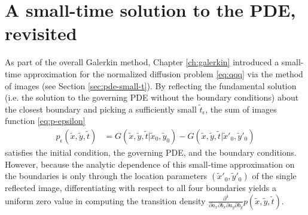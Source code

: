 \section{A small-time solution to the PDE, revisited}
As part of the overall Galerkin method, Chapter \ref{ch:galerkin}
introduced a small-time approximation for the normalized diffusion
problem \eqref{eq:qqq} via the method of images (see Section
\ref{sec:pde-small-t}). By reflecting the fundamental solution
(i.e. the solution to the governing PDE without the boundary conditions) about the
closest boundary and picking a sufficiently small
$\tilde{t}_\epsilon$, the sum of images function \eqref{eq:p-epsilon}
\begin{align}
  p_\epsilon(\tilde{x}, \tilde{y}, \tilde{t}) &= G(\tilde{x}, \tilde{y}, \tilde{t} | \tilde{x}_0, \tilde{y}_0) - G(\tilde{x}, \tilde{y}, \tilde{t} | \tilde{x}'_0, \tilde{y}'_0)
\end{align}
satisfies the initial condition, the governing PDE, and the boundary
conditions. However, because the analytic dependence of this
small-time approximation on the boundaries is only through the
location parameters $(\tilde{x}'_0, \tilde{y}'_0)$ of the single
reflected image, differentiating with respect to all four boundaries
yields a uniform zero value in computing the transition density
$\frac{\partial^4}{\partial a_x \partial b_x \partial a_y \partial
  b_y} p(\tilde{x}, \tilde{y}, \tilde{t})$.


